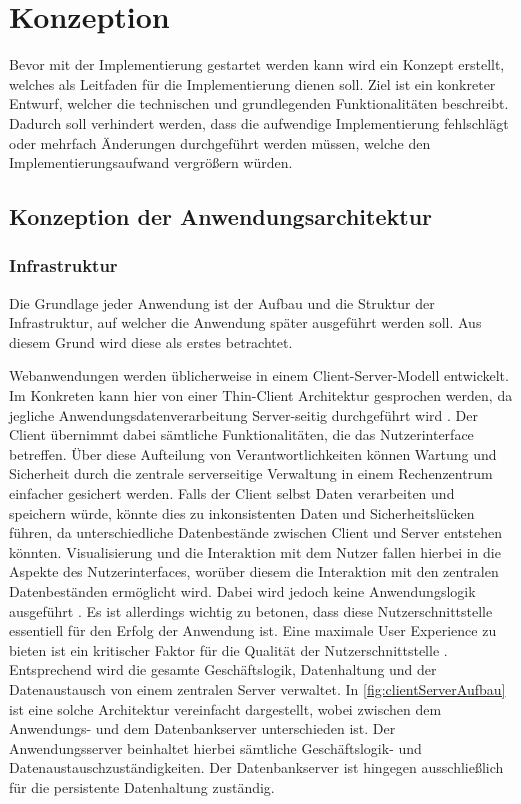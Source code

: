 \chapter{Konzeption}
Bevor mit der Implementierung gestartet werden kann wird ein Konzept erstellt, welches als Leitfaden für die Implementierung dienen soll.
Ziel ist ein konkreter Entwurf, welcher die technischen und grundlegenden Funktionalitäten beschreibt.
Dadurch soll verhindert werden, dass die aufwendige Implementierung fehlschlägt oder mehrfach Änderungen durchgeführt werden müssen, welche den Implementierungsaufwand vergrößern würden.


\section{Konzeption der Anwendungsarchitektur}

\subsection{Infrastruktur}
Die Grundlage jeder Anwendung ist der Aufbau und die Struktur der Infrastruktur, auf welcher die Anwendung später ausgeführt werden soll.
Aus diesem Grund wird diese als erstes betrachtet.


Webanwendungen werden üblicherweise in einem Client-Server-Modell entwickelt. Im Konkreten kann hier von einer Thin-Client Architektur gesprochen werden, da jegliche Anwendungsdatenverarbeitung Server-seitig durchgeführt wird \autocite{definitionOfThinClient}. %
Der Client übernimmt dabei sämtliche Funktionalitäten, die das Nutzerinterface betreffen. Über diese Aufteilung von Verantwortlichkeiten können Wartung und Sicherheit durch die zentrale serverseitige Verwaltung in einem Rechenzentrum einfacher gesichert werden. Falls der Client selbst Daten verarbeiten und speichern würde, könnte dies zu inkonsistenten Daten und Sicherheitslücken führen, da unterschiedliche Datenbestände zwischen Client und Server entstehen könnten. 
Visualisierung und die Interaktion mit dem Nutzer fallen hierbei in die Aspekte des Nutzerinterfaces, worüber diesem die Interaktion mit den zentralen Datenbeständen ermöglicht wird. Dabei wird jedoch keine Anwendungslogik ausgeführt \autocite{thinClientArchitectureOverview}. Es ist allerdings wichtig zu betonen, dass diese Nutzerschnittstelle essentiell für den Erfolg der Anwendung ist. Eine maximale User Experience \autocite{definitionUserExperience} zu bieten ist ein kritischer Faktor für die Qualität der Nutzerschnittstelle \autocite{thinClientArchitectureOverview}.\\
Entsprechend wird die gesamte Geschäftslogik, Datenhaltung und der Datenaustausch von einem zentralen Server verwaltet. 
In \autoref{fig:clientServerAufbau} ist eine solche Architektur vereinfacht dargestellt, wobei zwischen dem Anwendungs- und dem Datenbankserver unterschieden ist. Der Anwendungsserver beinhaltet hierbei sämtliche Geschäftslogik- und Datenaustauschzuständigkeiten. Der Datenbankserver ist hingegen ausschließlich für die persistente Datenhaltung zuständig.

